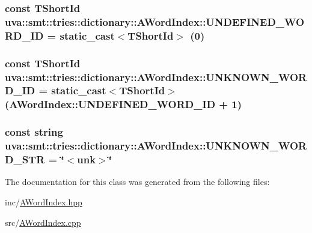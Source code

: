 \subsubsection[{U\+N\+D\+E\+F\+I\+N\+E\+D\+\_\+\+W\+O\+R\+D\+\_\+\+I\+D}]{\setlength{\rightskip}{0pt plus 5cm}const {\bf T\+Short\+Id} uva\+::smt\+::tries\+::dictionary\+::\+A\+Word\+Index\+::\+U\+N\+D\+E\+F\+I\+N\+E\+D\+\_\+\+W\+O\+R\+D\+\_\+\+I\+D = static\+\_\+cast$<${\bf T\+Short\+Id}$>$ (0)\hspace{0.3cm}{\ttfamily [static]}}\label{classuva_1_1smt_1_1tries_1_1dictionary_1_1_a_word_index_ac88fb565f5b572fdac67d546c124cfa8}
\hypertarget{classuva_1_1smt_1_1tries_1_1dictionary_1_1_a_word_index_a975e0ce3eb5986019ef5b67cff84806e}{}
\subsubsection[{U\+N\+K\+N\+O\+W\+N\+\_\+\+W\+O\+R\+D\+\_\+\+I\+D}]{\setlength{\rightskip}{0pt plus 5cm}const {\bf T\+Short\+Id} uva\+::smt\+::tries\+::dictionary\+::\+A\+Word\+Index\+::\+U\+N\+K\+N\+O\+W\+N\+\_\+\+W\+O\+R\+D\+\_\+\+I\+D = static\+\_\+cast$<${\bf T\+Short\+Id}$>$ ({\bf A\+Word\+Index\+::\+U\+N\+D\+E\+F\+I\+N\+E\+D\+\_\+\+W\+O\+R\+D\+\_\+\+I\+D} + 1)\hspace{0.3cm}{\ttfamily [static]}}\label{classuva_1_1smt_1_1tries_1_1dictionary_1_1_a_word_index_a975e0ce3eb5986019ef5b67cff84806e}
\hypertarget{classuva_1_1smt_1_1tries_1_1dictionary_1_1_a_word_index_a2059cfaea3b8d1253cafb9b3ccb1cc28}{}
\subsubsection[{U\+N\+K\+N\+O\+W\+N\+\_\+\+W\+O\+R\+D\+\_\+\+S\+T\+R}]{\setlength{\rightskip}{0pt plus 5cm}const string uva\+::smt\+::tries\+::dictionary\+::\+A\+Word\+Index\+::\+U\+N\+K\+N\+O\+W\+N\+\_\+\+W\+O\+R\+D\+\_\+\+S\+T\+R = \char`\"{}$<$unk$>$\char`\"{}\hspace{0.3cm}{\ttfamily [static]}}\label{classuva_1_1smt_1_1tries_1_1dictionary_1_1_a_word_index_a2059cfaea3b8d1253cafb9b3ccb1cc28}


The documentation for this class was generated from the following files\+:\begin{DoxyCompactItemize}
\item 
inc/\hyperlink{_a_word_index_8hpp}{A\+Word\+Index.\+hpp}\item 
src/\hyperlink{_a_word_index_8cpp}{A\+Word\+Index.\+cpp}\end{DoxyCompactItemize}
